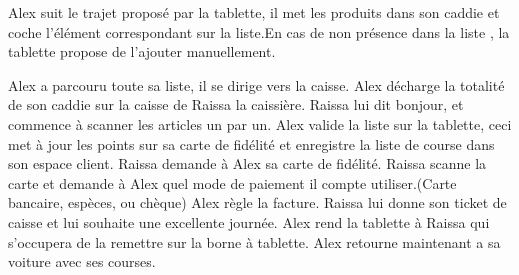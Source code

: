 Alex suit le trajet proposé par la tablette, il met les produits dans son caddie et coche l'élément correspondant sur la liste.En cas de non présence dans la liste , la tablette propose de l'ajouter manuellement.
\par

Alex a parcouru toute sa liste, il se dirige vers la caisse. 
Alex décharge la totalité de son caddie sur la caisse de Raissa la caissière.
Raissa lui dit bonjour, et commence à scanner les articles un par un.
Alex valide la liste sur la tablette, ceci met à jour les points sur sa carte de fidélité et enregistre la liste de course dans son espace client.
Raissa demande à Alex sa carte de fidélité.
Raissa scanne la carte et demande à Alex quel mode de paiement il compte utiliser.(Carte bancaire, espèces, ou chèque)
Alex règle la facture.
Raissa lui donne son ticket de caisse et lui souhaite une excellente journée.
Alex rend la tablette à Raissa qui s'occupera de la remettre sur la borne à tablette.
Alex retourne maintenant a sa voiture avec ses courses.
\stopitemize


